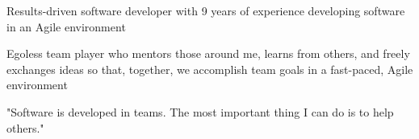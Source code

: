 %
    \begin{itemize*}
        \item Results-driven software developer with 9 years of experience developing software in an Agile environment
        \item Egoless team player who mentors those around me, learns from others, and freely exchanges ideas so that,
            together, we accomplish team goals in a fast-paced, Agile environment
        \item "Software is developed in teams.  The most important thing I can do is to help others."
    \end{itemize*}
